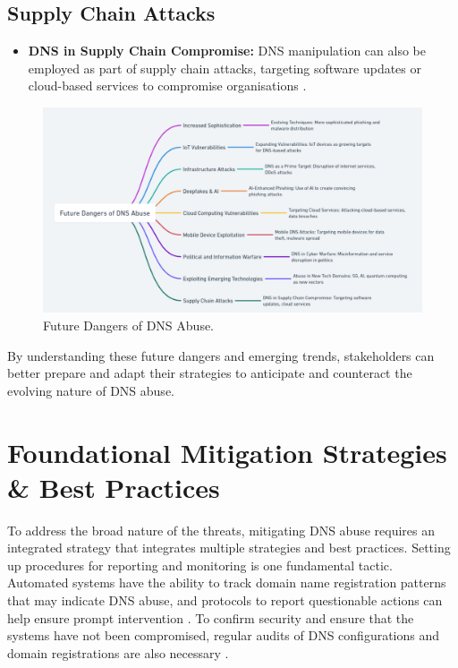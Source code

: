 \subsection{Supply Chain Attacks}
\begin{itemize}
    \item \textbf{DNS in Supply Chain Compromise:} DNS manipulation can also be employed as part of supply chain attacks, targeting software updates or cloud-based services to compromise organisations \cite{boyson2014cyber}.
\end{itemize}



\captionsetup{font= footnotesize} 
\begin{figure}  [H]
    \centering
    \includegraphics[width=\textwidth]{background/Future Dangers of DNS Abuse.png}
    \caption{Future Dangers of DNS Abuse.}
    \label{fig:LOLOLOL}
\end{figure}

By understanding these future dangers and emerging trends, stakeholders can better prepare and adapt their strategies to anticipate and counteract the evolving nature of DNS abuse.


\section{Foundational Mitigation Strategies \& Best Practices }

To address the broad nature of the threats, mitigating DNS abuse requires an integrated strategy that integrates multiple strategies and best practices. Setting up procedures for reporting and monitoring is one fundamental tactic. Automated systems have the ability to track domain name registration patterns that may indicate DNS abuse, and protocols to report questionable actions can help ensure prompt intervention \cite{icannndnssec}. To confirm security and ensure that the systems have not been compromised, regular audits of DNS configurations and domain registrations are also necessary \cite{lucas2021tls} .

